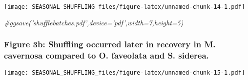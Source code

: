 \documentclass[]{article}
\newenvironment{Shaded}{\begin{snugshade}}{\end{snugshade}}
\newcommand{\CommentTok}[1]{\textcolor[rgb]{0.56,0.35,0.01}{\textit{#1}}}
\newcommand{\DataTypeTok}[1]{\textcolor[rgb]{0.13,0.29,0.53}{#1}}
\newcommand{\DecValTok}[1]{\textcolor[rgb]{0.00,0.00,0.81}{#1}}
\newcommand{\KeywordTok}[1]{\textcolor[rgb]{0.13,0.29,0.53}{\textbf{#1}}}
\newcommand{\NormalTok}[1]{#1}
\newcommand{\OperatorTok}[1]{\textcolor[rgb]{0.81,0.36,0.00}{\textbf{#1}}}
\newcommand{\StringTok}[1]{\textcolor[rgb]{0.31,0.60,0.02}{#1}}
\begin{document}
\texttt{[image: SEASONAL\_SHUFFLING\_files/figure-latex/unnamed-chunk-14-1.pdf]}

\begin{Shaded}
\begin{Highlighting}[]
\CommentTok{#ggsave('shufflebatches.pdf',device='pdf',width=7,height=5)}
\end{Highlighting}
\end{Shaded}

\hypertarget{figure-3b-shuffling-occurred-later-in-recovery-in-m.-cavernosa-compared-to-o.-faveolata-and-s.-siderea.}{%
\subsubsection{Figure 3b: Shuffling occurred later in recovery in M.
cavernosa compared to O. faveolata and S.
siderea.}\label{figure-3b-shuffling-occurred-later-in-recovery-in-m.-cavernosa-compared-to-o.-faveolata-and-s.-siderea.}}

\begin{Shaded}
\end{Shaded}

\texttt{[image: SEASONAL\_SHUFFLING\_files/figure-latex/unnamed-chunk-15-1.pdf]}
\end{document}

